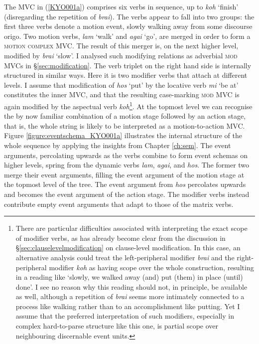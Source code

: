 The MVC in (\ref{KYO001a}) comprises six verbs in sequence, up to \textit{koh} `finish' (disregarding the repetition of \textit{brai}). The verbs appear to fall into two groups: the first three verbs denote a motion event, slowly walking away from some discourse origo. Two motion verbs, \textit{lam} `walk' and \textit{agai} `go', are merged in order to form a \textsc{motion complex} MVC. The result of this merger is, on the next higher level, modified by \textit{brai} `slow'. I analysed such modifying relations as adverbial \textsc{mod} MVCs in §\ref{sec:modification}. The verb triplet on the right hand side is internally structured in similar ways. Here it is two modifier verbs that attach at different levels. I assume that modification of \textit{hos} `put' by the locative verb \textit{mi} `be at' constitutes the inner MVC, and that the resulting case-marking \textsc{mod} MVC is again modified by the aspectual verb \textit{koh}\footnote{There are particular difficulties associated with interpreting the exact scope of modifier verbs, as has already become clear from the discussion in §\ref{sec:clauselevelmodification} on clause-level modification. In this case, an alternative analysis could treat the left-peripheral modifier \textit{brai} and the right-peripheral modifier \textit{koh} as having scope over the whole construction, resulting in a reading like `slowly, we walked away (and) put (them) in place (until) done'. I see no reason why this reading should not, in principle, be available as well, although a repetition of \textit{brai} seems more intimately connected to a process like walking rather than to an accomplishment like putting. Yet I assume that the preferred interpretation of such modifiers, especially in complex hard-to-parse structure like this one, is partial scope over neighbouring discernable event units.}. At the topmost level we can recognise the by now familiar combination of a motion stage followed by an action stage, that is, the whole string is likely to be interpreted as a motion-to-action MVC. Figure \ref{figure:eventschema_KYO001a} illustrates the internal structure of the whole sequence by applying the insights from Chapter \ref{ch:sem}. The event arguments, percolating upwards as the verbs combine to form event schemas on higher levels, spring from the dynamic verbs \textit{lam}, \textit{agai}, and \textit{hos}. The former two merge their event arguments, filling the event argument of the motion stage at the topmost level of the tree. The event argument from \textit{hos} percolates upwards and becomes the event argument of the action stage. The modifier verbs instead contribute empty event arguments that adapt to those of the matrix verbs.

